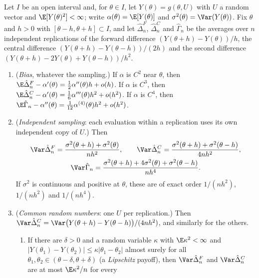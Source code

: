 \begin{proposition}\label{prop:gr-finite-difference}
Let $I$ be an open interval and, for $\theta\in I$, let $Y(\theta)=g(\theta,U)$ with $U$ a
random vector and $\E[Y(\theta)^2]<\infty$; write $\alpha(\theta)=\E[Y(\theta)]$ and
$\sigma^2(\theta)=\Var(Y(\theta))$. Fix $\theta$ and $h>0$ with $[\theta-h,\theta+h]\subset I$,
and let $\hat\Delta^F_{n}$, $\hat\Delta^C_{n}$ and $\hat\Gamma_{n}$ be the averages over $n$
independent replications of the forward difference $(Y(\theta+h)-Y(\theta))/h$, the central
difference $(Y(\theta+h)-Y(\theta-h))/(2h)$ and the second difference
$(Y(\theta+h)-2Y(\theta)+Y(\theta-h))/h^2$.
\begin{enumerate}[label=(\roman*)]
  \item (\emph{Bias}, whatever the sampling.) If $\alpha$ is $C^2$ near $\theta$, then
    $\E\hat\Delta^F_n-\alpha'(\theta)=\frac12\alpha''(\theta)h+o(h)$. If $\alpha$ is $C^3$, then
    $\E\hat\Delta^C_n-\alpha'(\theta)=\frac16\alpha'''(\theta)h^2+o(h^2)$. If $\alpha$ is $C^4$, then
    $\E\hat\Gamma_n-\alpha''(\theta)=\frac1{12}\alpha^{(4)}(\theta)h^2+o(h^2)$.
  \item (\emph{Independent sampling}: each evaluation within a replication uses its own
    independent copy of $U$.) Then
    \begin{gather*}
      \Var\hat\Delta^F_n=\frac{\sigma^2(\theta+h)+\sigma^2(\theta)}{nh^2},\qquad
      \Var\hat\Delta^C_n=\frac{\sigma^2(\theta+h)+\sigma^2(\theta-h)}{4nh^2},\\
      \Var\hat\Gamma_n=\frac{\sigma^2(\theta+h)+4\sigma^2(\theta)+\sigma^2(\theta-h)}{nh^4}.
    \end{gather*}
    If $\sigma^2$ is continuous and positive at $\theta$, these are of exact order
    $1/(nh^2)$, $1/(nh^2)$ and $1/(nh^4)$.
  \item (\emph{Common random numbers}: one $U$ per replication.) Then
    $\Var\hat\Delta^C_n=\Var\big(Y(\theta+h)-Y(\theta-h)\big)/(4nh^2)$, and similarly for the
    others.
    \begin{enumerate}[label=(\alph*)]
      \item If there are $\delta>0$ and a random variable $\kappa$ with $\E\kappa^2<\infty$
        and $|Y(\theta_1)-Y(\theta_2)|\le\kappa|\theta_1-\theta_2|$ almost surely for all
        $\theta_1,\theta_2\in(\theta-\delta,\theta+\delta)$ (a \emph{Lipschitz} payoff),
        then $\Var\hat\Delta^F_n$ and $\Var\hat\Delta^C_n$ are at most $\E\kappa^2/n$ for every

\end{enumerate}
\end{enumerate}
\end{proposition}

